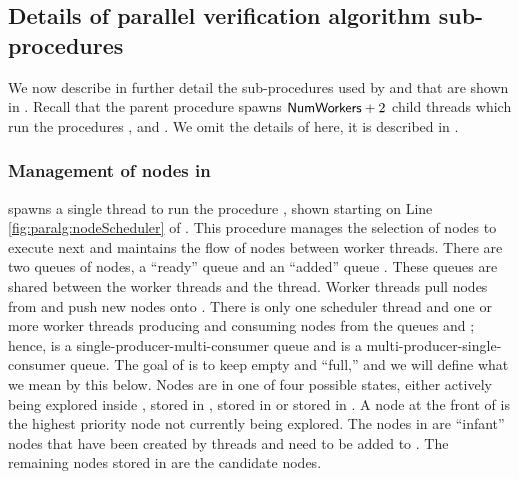 \subsection{Details of parallel verification algorithm sub-procedures} 
\label{sec:par:nodedetails}

We now describe in further detail the sub-procedures used by
\parallelVerifyAlg and that are shown in .
Recall that the parent procedure \parallelVerifyAlg spawns
$\mathsf{NumWorkers}+2$ child threads which run the procedures
\clusterSelector, \nodeScheduler and \verifyWorker. We omit the
details of \clusterSelector here, it is described in
.

\subsubsection{Management of nodes in \nodeScheduler}

\parallelVerifyAlg spawns a single thread to run the procedure
\nodeScheduler, shown starting on Line \ref{fig:paralg:nodeScheduler}
of . This procedure manages the selection of
nodes to execute next and maintains the flow of nodes between worker
threads. There are two queues of nodes, a ``ready'' queue \readyQ and
an ``added'' queue \addedQ. These queues are shared between the worker
threads and the \nodeScheduler thread. Worker threads pull nodes from
\readyQ and push new nodes onto \addedQ. There is only one scheduler
thread and one or more worker threads producing and consuming nodes
from the queues \readyQ and \addedQ; hence, \readyQ is
a single-producer-multi-consumer queue and \addedQ is a
multi-producer-single-consumer queue. The goal of \nodeScheduler is to
keep \addedQ empty and \readyQ ``full,'' and we will define what we
mean by this below. Nodes are in one of four possible states, either
actively being explored inside \verifyWorker, stored in \readyQ,
stored in \addedQ or stored in \liveSet. A node at the front of
\readyQ is the highest priority node not currently being explored. The
nodes in \addedQ are ``infant'' nodes that have been created by
\verifyWorker threads and need to be added to \liveSet. The remaining
nodes stored in \liveSet are the candidate nodes.

